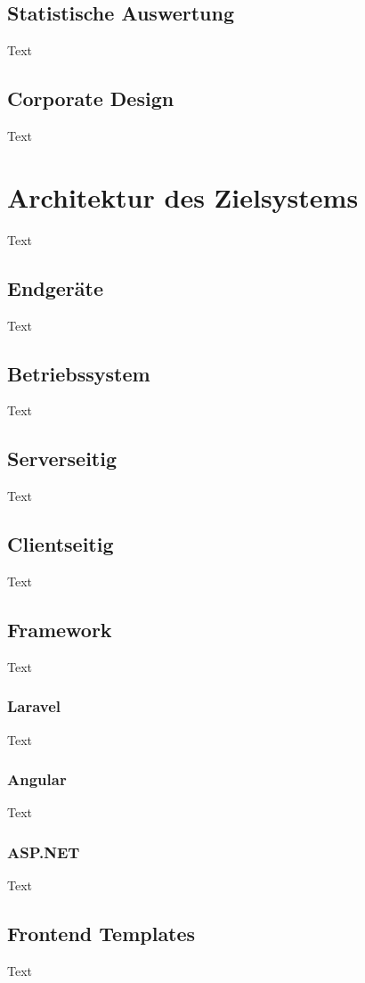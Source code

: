 \subsection{Statistische Auswertung}
Text

\subsection{Corporate Design}
Text



\section{Architektur des Zielsystems}
Text

\subsection{Endgeräte }
Text

\subsection{Betriebssystem }
Text

\subsection{Serverseitig }
Text

\subsection{Clientseitig }
Text

\subsection{Framework }
Text
\subsubsection{Laravel}
Text
\subsubsection{Angular}
Text
\subsubsection{ASP.NET}
Text

\subsection{Frontend Templates}
Text

